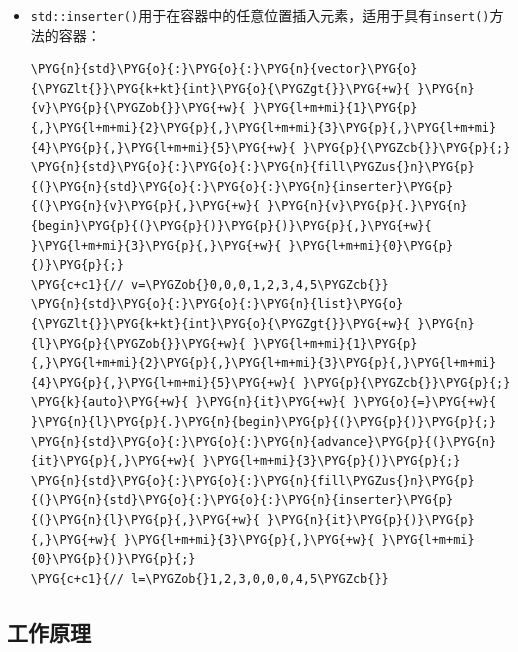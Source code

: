 \begin{itemize}

\item \texttt{std::\allowbreak{}inserter()}用于在容器中的任意位置插入元素，适用于具有\texttt{insert()}方法的容器：



\begin{codeblockbg}
\begin{Verbatim}[commandchars=\\\{\},breaklines=true,breakanywhere=true,fontsize=\codefont,xleftmargin=17bp]
\PYG{n}{std}\PYG{o}{:}\PYG{o}{:}\PYG{n}{vector}\PYG{o}{\PYGZlt{}}\PYG{k+kt}{int}\PYG{o}{\PYGZgt{}}\PYG{+w}{ }\PYG{n}{v}\PYG{p}{\PYGZob{}}\PYG{+w}{ }\PYG{l+m+mi}{1}\PYG{p}{,}\PYG{l+m+mi}{2}\PYG{p}{,}\PYG{l+m+mi}{3}\PYG{p}{,}\PYG{l+m+mi}{4}\PYG{p}{,}\PYG{l+m+mi}{5}\PYG{+w}{ }\PYG{p}{\PYGZcb{}}\PYG{p}{;}
\PYG{n}{std}\PYG{o}{:}\PYG{o}{:}\PYG{n}{fill\PYGZus{}n}\PYG{p}{(}\PYG{n}{std}\PYG{o}{:}\PYG{o}{:}\PYG{n}{inserter}\PYG{p}{(}\PYG{n}{v}\PYG{p}{,}\PYG{+w}{ }\PYG{n}{v}\PYG{p}{.}\PYG{n}{begin}\PYG{p}{(}\PYG{p}{)}\PYG{p}{)}\PYG{p}{,}\PYG{+w}{ }\PYG{l+m+mi}{3}\PYG{p}{,}\PYG{+w}{ }\PYG{l+m+mi}{0}\PYG{p}{)}\PYG{p}{;}
\PYG{c+c1}{// v=\PYGZob{}0,0,0,1,2,3,4,5\PYGZcb{}}
\PYG{n}{std}\PYG{o}{:}\PYG{o}{:}\PYG{n}{list}\PYG{o}{\PYGZlt{}}\PYG{k+kt}{int}\PYG{o}{\PYGZgt{}}\PYG{+w}{ }\PYG{n}{l}\PYG{p}{\PYGZob{}}\PYG{+w}{ }\PYG{l+m+mi}{1}\PYG{p}{,}\PYG{l+m+mi}{2}\PYG{p}{,}\PYG{l+m+mi}{3}\PYG{p}{,}\PYG{l+m+mi}{4}\PYG{p}{,}\PYG{l+m+mi}{5}\PYG{+w}{ }\PYG{p}{\PYGZcb{}}\PYG{p}{;}
\PYG{k}{auto}\PYG{+w}{ }\PYG{n}{it}\PYG{+w}{ }\PYG{o}{=}\PYG{+w}{ }\PYG{n}{l}\PYG{p}{.}\PYG{n}{begin}\PYG{p}{(}\PYG{p}{)}\PYG{p}{;}
\PYG{n}{std}\PYG{o}{:}\PYG{o}{:}\PYG{n}{advance}\PYG{p}{(}\PYG{n}{it}\PYG{p}{,}\PYG{+w}{ }\PYG{l+m+mi}{3}\PYG{p}{)}\PYG{p}{;}
\PYG{n}{std}\PYG{o}{:}\PYG{o}{:}\PYG{n}{fill\PYGZus{}n}\PYG{p}{(}\PYG{n}{std}\PYG{o}{:}\PYG{o}{:}\PYG{n}{inserter}\PYG{p}{(}\PYG{n}{l}\PYG{p}{,}\PYG{+w}{ }\PYG{n}{it}\PYG{p}{)}\PYG{p}{,}\PYG{+w}{ }\PYG{l+m+mi}{3}\PYG{p}{,}\PYG{+w}{ }\PYG{l+m+mi}{0}\PYG{p}{)}\PYG{p}{;}
\PYG{c+c1}{// l=\PYGZob{}1,2,3,0,0,0,4,5\PYGZcb{}}
\end{Verbatim}
\end{codeblockbg}

\end{itemize}



\subsection{工作原理}


